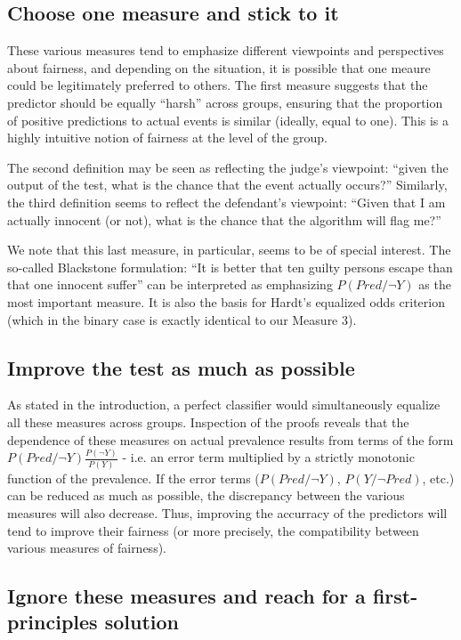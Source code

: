 \documentclass[twocolumn]{article}
\begin{document}
\subsection{Choose one measure and stick to it} 

These various measures tend to emphasize different viewpoints and perspectives about fairness, and depending on the situation, it is possible that one meaure could be legitimately preferred to others.
The first measure suggests that the predictor should be equally ``harsh'' across groups, ensuring that the proportion of positive predictions to actual events is similar (ideally, equal to one). This is a highly intuitive notion of fairness at the level of the group.

The second definition may be seen as reflecting the judge's
viewpoint: ``given the output of the test, what is the chance that the event
actually occurs?'' Similarly, the third definition seems to reflect the
defendant's viewpoint: ``Given that I am actually innocent (or not), what is the chance that the algorithm will flag me?''

We note that this last measure, in particular, seems to be of special interest. The so-called Blackstone formulation: ``It is better that ten guilty persons escape than that one innocent suffer'' can be interpreted as emphasizing $P(Pred/\neg Y)$ as the most important measure. It is also the basis for Hardt's equalized odds criterion \cite{hardt2016equality} (which in the binary case is exactly identical to our Measure 3).


\subsection{Improve the test as much as possible}

As stated in the introduction, a perfect classifier would simultaneously equalize all these measures across groups. Inspection of the proofs reveals that the dependence of these measures on actual prevalence results from terms of the form  $P(Pred / \neg Y) \frac{P(\neg Y)}{P(Y)}$ - i.e. an error term multiplied by a strictly monotonic function of the prevalence. If the error terms ($P(Pred / \neg Y)$, $P(Y / \neg Pred)$, etc.) can be reduced as much as possible, the discrepancy between the various measures will also decrease. Thus, improving the accurracy of the predictors will tend to improve their fairness (or more precisely, the compatibility between various measures of fairness).

\subsection{Ignore these measures and reach for a first-principles solution}
\end{document}

